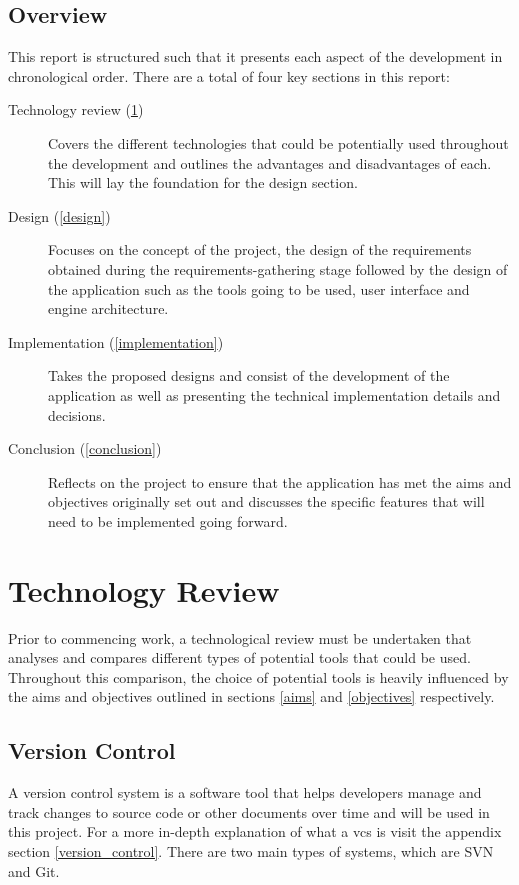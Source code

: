 \documentclass[11pt]{article}
\begin{document}
\subsection{Overview}
This report is structured such that it presents each aspect of the development
in chronological order. There are a total of four key sections in this report:
\begin{description}
  \item[Technology review (\ref{technology_review})] Covers the different
    technologies that could be potentially used throughout the development and
    outlines the advantages and disadvantages of each. This will lay the
    foundation for the design section.
  \item[Design (\ref{design})] Focuses on the concept of the project, the design
    of the requirements obtained during the requirements-gathering stage
    followed by the design of the application such as the tools going to be
    used, user interface and engine architecture.
  \item[Implementation (\ref{implementation})] Takes the proposed designs and
    consist of the development of the application as well as presenting the
    technical implementation details and decisions.
  \item[Conclusion (\ref{conclusion})] Reflects on the project to ensure that
    the application has met the aims and objectives originally set out and
    discusses the specific features that will need to be implemented going
    forward.
\end{description}

\clearpage
\section{Technology Review} \label{technology_review}
Prior to commencing work, a technological review must be undertaken that
analyses and compares different types of potential tools that could be used.
Throughout this comparison, the choice of potential tools is heavily influenced
by the aims and objectives outlined in sections \ref{aims} and \ref{objectives}
respectively.


\subsection{Version Control}
A version control system is a software tool that helps developers manage and
track changes to source code or other documents over time and will be used in
this project. For a more in-depth explanation of what a \gls*{vcs} is visit the
appendix section \ref{version_control}. There are two main types of systems,
which are SVN and Git.
\end{document}
